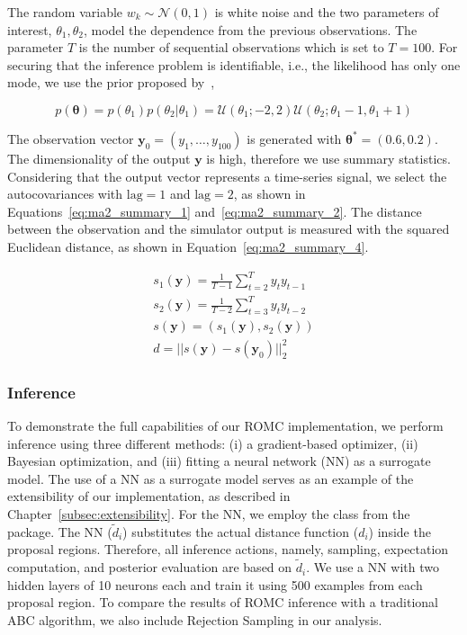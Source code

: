 \documentclass[article]{jss}
\newcommand{\yb}{\mathbf{y}}
\newcommand{\thetab}{\boldsymbol{\theta}}
\begin{document}
\noindent
The random variable \(w_{k} \sim \mathcal{N}(0,1) \) is white noise
and the two parameters of interest, \(\theta_1, \theta_2\), model the
dependence from the previous observations. The parameter \(T\) is the
number of sequential observations which is set to \(T=100\). For
securing that the inference problem is identifiable, i.e., the
likelihood has only one mode, we use the prior proposed
by~\cite{Marin2012},

\begin{equation} \label{eq:ma2_prior}
p(\thetab) = p(\theta_1)p(\theta_2|\theta_1)
= \mathcal{U}(\theta_1;-2,2)\mathcal{U}(\theta_2;\theta_1-1, \theta_1+1)
\end{equation}

\noindent
The observation vector \(\yb_0 = (y_1, \ldots, y_{100})\) is generated
with \(\thetab^*=(0.6, 0.2)\). The dimensionality of the output
\(\yb\) is high, therefore we use summary statistics. Considering that
the output vector represents a time-series signal, we select the
autocovariances with \(\mathrm{lag}=1\) and \(\mathrm{lag}=2\), as
shown in Equations~\ref{eq:ma2_summary_1}
and~\ref{eq:ma2_summary_2}. The distance between the observation and
the simulator output is measured with the squared Euclidean distance,
as shown in Equation~\ref{eq:ma2_summary_4}.

\begin{gather}
  \label{eq:ma2_summary_1} s_1(\yb) = \frac{1}{T-1} \sum_{t=2}^T y_ty_{t-1}\\
  \label{eq:ma2_summary_2} s_2(\yb) = \frac{1}{T-2} \sum_{t=3}^T y_ty_{t-2} \\
  s(\yb) = (s_1(\yb), s_2(\yb))\\
  \label{eq:ma2_summary_4} d = ||s(\yb) - s(\yb_0)||_2^2
\end{gather}

\subsubsection*{Inference}

To demonstrate the full capabilities of our ROMC implementation, we
perform inference using three different methods: (i) a gradient-based
optimizer, (ii) Bayesian optimization, and (iii) fitting a neural
network (NN) as a surrogate model. The use of a NN as a surrogate
model serves as an example of the extensibility of our implementation,
as described in Chapter~\ref{subsec:extensibility}. For the NN, we
employ the  class from the 
package. The NN (\(\tilde{d}_i\)) substitutes the actual distance
function (\(d_i\)) inside the proposal regions. Therefore, all
inference actions, namely, sampling, expectation computation, and
posterior evaluation are based on \(\tilde{d}_i\). We use a NN with
two hidden layers of 10 neurons each and train it using 500 examples
from each proposal region. To compare the results of ROMC inference
with a traditional ABC algorithm, we also include Rejection Sampling
in our analysis.
\end{document}
